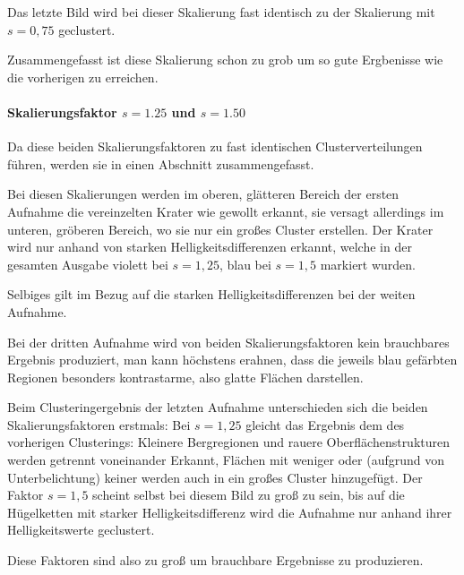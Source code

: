 Das letzte Bild wird bei dieser Skalierung fast identisch zu der Skalierung mit $s=0,75$ geclustert.

Zusammengefasst ist diese Skalierung schon zu grob um so gute Ergbenisse wie die vorherigen zu erreichen.

\paragraph{Skalierungsfaktor $s=1.25$ und $s=1.50$}

Da diese beiden Skalierungsfaktoren zu fast identischen Clusterverteilungen führen, werden sie in einen Abschnitt zusammengefasst.

Bei diesen Skalierungen werden im oberen, glätteren Bereich der ersten Aufnahme die vereinzelten Krater wie gewollt erkannt, sie versagt allerdings im unteren, gröberen Bereich, wo sie nur ein großes Cluster erstellen. Der Krater wird nur anhand von starken Helligkeitsdifferenzen erkannt, welche in der gesamten Ausgabe violett bei $s=1,25$, \bzw blau bei $s=1,5$ markiert wurden. 

Selbiges gilt im Bezug auf die starken Helligkeitsdifferenzen bei der weiten Aufnahme.

Bei der dritten Aufnahme wird von beiden Skalierungsfaktoren kein brauchbares Ergebnis produziert, man kann höchstens erahnen, dass die jeweils blau gefärbten Regionen besonders kontrastarme, also glatte Flächen darstellen.

Beim Clusteringergebnis der letzten Aufnahme unterschieden sich die beiden Skalierungsfaktoren erstmals: Bei $s=1,25$ gleicht das Ergebnis dem des vorherigen Clusterings: Kleinere Bergregionen und rauere Oberflächenstrukturen werden getrennt voneinander Erkannt, Flächen mit weniger oder (aufgrund von Unterbelichtung) keiner werden auch in ein großes Cluster hinzugefügt. Der Faktor $s=1,5$ scheint selbst bei diesem Bild zu groß zu sein, bis auf die Hügelketten mit starker Helligkeitsdifferenz wird die Aufnahme nur anhand ihrer Helligkeitswerte geclustert.

Diese Faktoren sind also zu groß um brauchbare Ergebnisse zu produzieren.

